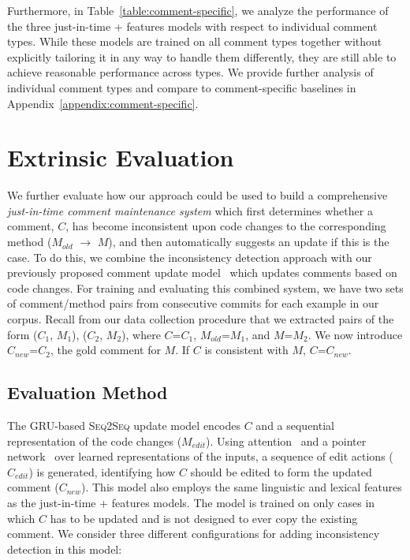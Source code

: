 \documentclass[letterpaper]{article} %
\newcommand{\CommentA}{$C_{1}$}
\newcommand{\CommentB}{$C_{2}$}
\newcommand{\CodeA}{$M_{1}$}
\newcommand{\CodeB}{$M_{2}$}
\newcommand{\Comment}{$C$}
\newcommand{\OldCode}{$M_{old}$}
\newcommand{\NewCode}{$M$}
\newcommand{\NewComment}{$C_{new}$}
\newcommand{\EditComment}{$C_{edit}$}
\newcommand{\JustInTime}{just-in-time}
\newcommand{\EditCode}{$M_{edit}$}
\begin{document}
Furthermore, in Table~\ref{table:comment-specific},
we analyze the performance of the three \JustInTime{} + features models with respect to individual comment types. While these models are trained on all comment types together without explicitly tailoring it in any way to handle them differently, they are still able to achieve reasonable performance across types.
We provide further analysis of individual comment types and compare to comment-specific baselines in Appendix~\ref{appendix:comment-specific}.



\section{Extrinsic Evaluation}
We further evaluate how our approach could be used to build a comprehensive \emph{\JustInTime{} comment maintenance system} which first determines whether a comment, \Comment{}, has become inconsistent upon code changes to the corresponding method (\OldCode{} $\rightarrow$ \NewCode{}), and then automatically suggests an update if this is the case. To do this, we combine the inconsistency detection approach with our previously proposed comment update model~\cite{panthaplackel2020update} which updates comments based on code changes. For training and evaluating this combined system, we have two sets of comment/method pairs from consecutive commits for each example in our corpus. Recall from our data collection procedure that we extracted pairs of the form (\CommentA{}, \CodeA{}), (\CommentB{}, \CodeB{}), where \Comment{}=\CommentA{}, \OldCode{}=\CodeA{}, and \NewCode{}=\CodeB{}. We now introduce \NewComment{}=\CommentB{}, the gold comment for \NewCode{}. If \Comment{} is consistent with \NewCode{}, \Comment{}=\NewComment{}.


\subsection{Evaluation Method}
\label{sec:extrinsic-method}
The GRU-based \textsc{Seq2Seq} update model encodes \Comment{} and a sequential representation of the code changes (\EditCode{}). Using attention~\cite{Luong2015Attention} and a pointer network~\cite{VinyalsPointer} over learned representations of the inputs, a sequence of edit actions (\EditComment{}) is generated, identifying how \Comment{} should be edited to form the updated comment (\NewComment{}). This model also employs the same linguistic and lexical features as the \JustInTime{} + features models. The model is trained on only cases in which \Comment{} has to be updated and is not designed to ever copy the existing comment. We consider three different configurations for adding inconsistency detection in this model:
\end{document}
